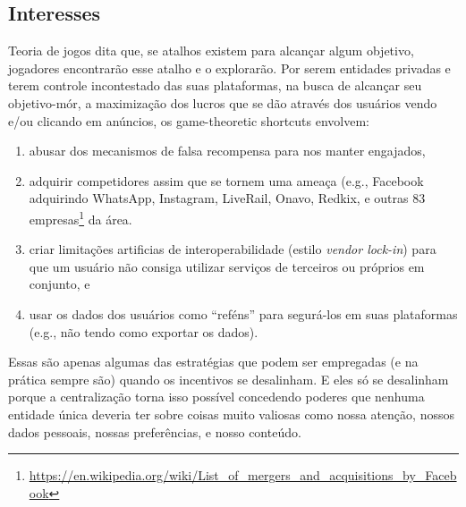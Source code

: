 


\subsection{Interesses}

Teoria de jogos dita que, se atalhos existem para alcançar algum objetivo, jogadores encontrarão esse atalho e o explorarão.
Por serem entidades privadas e terem controle incontestado das suas plataformas, na busca de alcançar seu objetivo-mór, a maximização dos lucros que se dão através dos usuários vendo e/ou clicando em anúncios, os game-theoretic shortcuts envolvem:

\begin{enumerate}
    \item abusar dos mecanismos de falsa recompensa  para nos manter engajados,
    \item adquirir competidores assim que se tornem uma ameaça (e.g., Facebook adquirindo WhatsApp, Instagram, LiveRail, Onavo, Redkix, e outras 83 empresas\footnote{\url{https://en.wikipedia.org/wiki/List_of_mergers_and_acquisitions_by_Facebook}} da área.
    \item criar limitações artificias de interoperabilidade (estilo \textit{vendor lock-in}) para que um usuário não consiga utilizar serviços de terceiros ou próprios em conjunto, e
    \item usar os dados dos usuários como ``reféns'' para segurá-los em suas plataformas (e.g., não tendo como exportar os dados).
\end{enumerate}

Essas são apenas algumas das estratégias que podem ser empregadas (e na prática sempre são) quando os incentivos se desalinham.
E eles só se desalinham porque a centralização torna isso possível concedendo poderes que nenhuma entidade única deveria ter sobre coisas muito valiosas como nossa atenção, nossos dados pessoais, nossas preferências, e nosso conteúdo.

